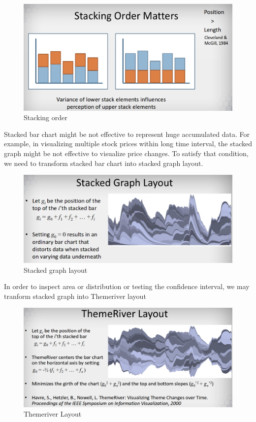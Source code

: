 \documentclass[11pt]{article}
\makeatletter
\def\maxwidth{\ifdim\Gin@nat@width>\linewidth\linewidth
    \else\Gin@nat@width\fi}
\let\Oldincludegraphics\includegraphics
\renewcommand{\includegraphics}[1]{\Oldincludegraphics[width=.8\maxwidth]{#1}}
\makeatother
\begin{document}
\begin{figure}
\centering
\includegraphics{images/stacked-bar-chart1.png}
\caption{Stacking order}
\end{figure}

Stacked bar chart might be not effective to represent huge accumulated
data. For example, in visualizing multiple stock prices within long time
interval, the stacked graph might be not effective to visualize price
changes. To satisfy that condition, we need to transform stacked bar
chart into stacked graph layout.

\begin{figure}
\centering
\includegraphics{images/stacked-graph-layout.png}
\caption{Stacked graph layout}
\end{figure}

In order to inspect area or distribution or testing the confidence
interval, we may tranform stacked graph into Themeriver layout

\begin{figure}
\centering
\includegraphics{images/themeriver-layout.png}
\caption{Themeriver Layout}
\end{figure}
\end{document}
